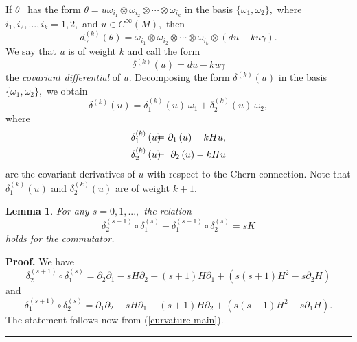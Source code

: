 \documentclass{article}
\newtheorem{lemma}[theorem]{Lemma}
\newenvironment{proof}[1][Proof]{\noindent\textbf{#1.} }{\ \rule{0.5em}{0.5em}}
\begin{document}
If $\theta $ \ has the form $\theta =u\omega _{i_{1}}\otimes \omega
_{i_{2}}\otimes \cdots \otimes \omega _{i_{k}}$ in the basis $\{\omega
_{1},\omega _{2}\},$ where $i_{1},i_{2},...,i_{k}=1,2,$ and $u\in C^{\infty
}\left( M\right) ,$ then
\begin{equation*}
d_{\gamma }^{(k)}\left( \theta \right) =\omega _{i_{1}}\otimes \omega
_{i_{2}}\otimes \cdots \otimes \omega _{i_{k}}\otimes \left( du-ku\gamma
\right) .
\end{equation*}%
We say that $u$ is of weight $k$ and call the form
\begin{equation}
\delta ^{\left( k\right) }\left( u\right) =du-ku\gamma
\label{covariant differential Vadim}
\end{equation}%
the \emph{covariant differential }of $u.$ Decomposing the form $\delta
^{\left( k\right) }\left( u\right) $ in the basis $\{\omega _{1},\omega
_{2}\},$ we obtain
\begin{equation*}
\delta ^{\left( k\right) }\left( u\right) =\delta _{1}^{\left( k\right)
}\left( u\right) ~\omega _{1}+\delta _{2}^{\left( k\right) }\left( u\right)
~\omega _{2},
\end{equation*}%
where
\begin{eqnarray}
\delta _{1}^{\left( k\right) }\left( u\right) &\!\!\!\!=&\!\!\!\!\partial
_{1}\left( u\right) -kHu,  \label{covariant derivatives weight k} \\
\delta _{2}^{\left( k\right) }\left( u\right) &\!\!\!\!=&\!\!\!\!\partial
_{2}\left( u\right) -kHu  \notag
\end{eqnarray}%
are the covariant derivatives of $u$ with respect to the Chern connection.
Note that $\delta _{1}^{\left( k\right) }\left( u\right) $ and $\delta
_{2}^{\left( k\right) }\left( u\right) $ are of weight $k+1.$

\begin{lemma}
For any $s=0,1,...,$ the relation
\begin{equation}
\delta _{2}^{\left( s+1\right) }\circ \delta _{1}^{\left( s\right) }-\delta
_{1}^{\left( s+1\right) }\circ \delta _{2}^{\left( s\right) }=sK
\label{covariant commutator}
\end{equation}%
holds for the commutator.
\end{lemma}

\begin{proof}
We have
\begin{equation*}
\delta _{2}^{\left( s+1\right) }\circ \delta _{1}^{\left( s\right)
}=\partial _{2}\partial _{1}-sH\partial _{2}-\left( s+1\right) H\partial
_{1}+\left( s\left( s+1\right) H^{2}-s\partial _{2}H\right)
\end{equation*}%
and
\begin{equation*}
\delta _{1}^{\left( s+1\right) }\circ \delta _{2}^{\left( s\right)
}=\partial _{1}\partial _{2}-sH\partial _{1}-\left( s+1\right) H\partial
_{2}+\left( s\left( s+1\right) H^{2}-s\partial _{1}H\right) .
\end{equation*}%
The statement follows now from (\ref{curvature main}).
\end{proof}
\end{document}

